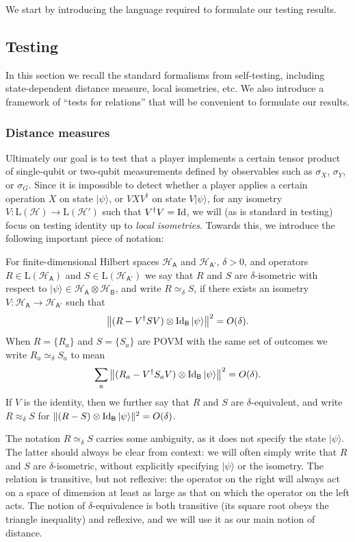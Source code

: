 \documentclass{toc}
\newcommand{\ket}[1]{|#1\rangle}
\newcommand{\Id}{\ensuremath{\mathop{\rm Id}\nolimits}}
\newcommand{\setft}[1]{\mathrm{#1}}
\newcommand{\Lin}{\setft{L}}
\newcommand{\reg}[1]{{\textsf{#1}}}
\newcommand{\mH}{\mathcal{H}}
\begin{document}
We start by introducing the language required to formulate our testing results. 



\subsection{Testing}
\label{sec:general-rigidity}
In this section we recall the standard formalisms from self-testing, including state-dependent distance measure, local isometries, etc. We also introduce a framework of ``tests for relations'' that will be convenient to formulate our results. 


\subsubsection{Distance measures}

Ultimately our goal is to test that a player implements a certain tensor product of single-qubit or two-qubit measurements defined by observables such as $\sigma_X$, $\sigma_Y$, or $\sigma_G$. Since it is impossible to detect whether a player applies a certain operation $X$ on state $\ket{\psi}$, or $VXV^\dagger$ on state $V\ket{\psi}$, for any isometry $V:\Lin(\mH)\to\Lin(\mH')$ such that $V^\dagger V = \Id$, we will (as is standard in testing) focus on testing identity up to \emph{local isometries}. Towards this, we introduce the following important piece of notation: 

\begin{definition}
For finite-dimensional Hilbert spaces $\mH_{\reg{A}}$ and $\mH_{\reg{A}'}$, $\delta>0$, and operators $R \in\Lin(\mH_{\reg{A}})$ and $S\in\Lin(\mH_{\reg{A}'})$ we say that $R$ and $S$ are $\delta$-isometric with respect to $\ket{\psi} \in \mH_{\reg{A}} \otimes \mH_{\reg{B}}$, and write $R\simeq_\delta S$, if there exists an isometry $V:\mH_{\reg{A}}\to\mH_{\reg{A}'}$ such that 
$$\big\|( R-V^\dagger SV)\otimes \Id_{\reg{B}} \ket{\psi}\big\|^2=O(\delta).$$
When $R = \{R_a\}$ and $S=\{S_a\}$ are POVM with the same set of outcomes we write $R_a \simeq_\delta S_a$ to mean
$$\sum_a \big\|( R_a-V^\dagger S_a V)\otimes \Id_{\reg{B}} \ket{\psi}\big\|^2=O(\delta).$$
If $V$ is the identity, then we further say that $R$ and $S$ are $\delta$-equivalent, and write $R\approx_\delta S$ for $\| ( R- S) \otimes \Id_{\reg{B}} \ket{\psi}\|^2=O(\delta)$.
\end{definition}

The notation $R\simeq_\delta S$ carries some ambiguity, as it does not specify the state $\ket{\psi}$. The latter should always be clear from context: we will often simply write that $R$ and $S$ are $\delta$-isometric, without explicitly specifying $\ket{\psi}$ or the isometry. The relation is transitive, but not reflexive: the operator on the right will always act on a space of dimension at least as large as that on which the operator on the left acts. The notion of $\delta$-equivalence is both transitive (its square root obeys the triangle inequality) and reflexive, and we will use it as our main notion of distance. 
\end{document}
